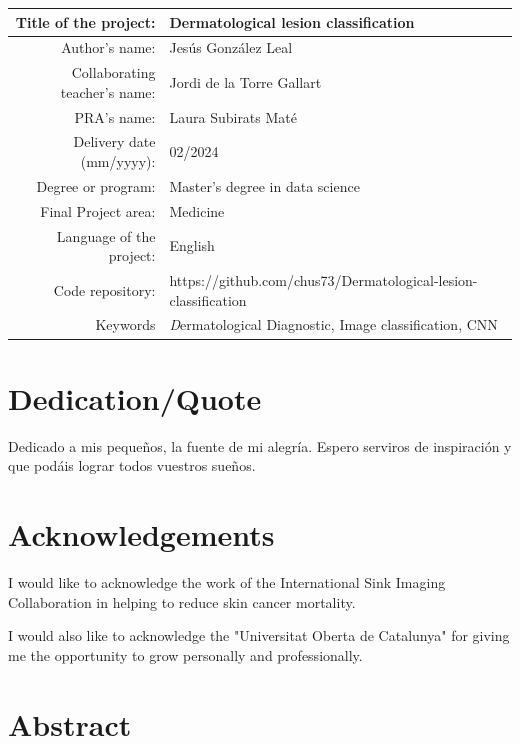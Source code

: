\begin{table}[ht]
\centering{}
\renewcommand{\arraystretch}{2}
\begin{tabular}{r | l}
\hline
Title of the project: & Dermatological lesion classification\\
\hline
Author's name: & Jesús González Leal\\
\hline
Collaborating teacher's name: & Jordi de la Torre Gallart\\
\hline
PRA's name: & Laura Subirats Maté\\
\hline
Delivery date (mm/yyyy): & 02/2024\\
\hline
Degree or program: & Master’s degree in data science\\
\hline
Final Project area: & Medicine\\
\hline
Language of the project: & English\\
\hline
Code repository: & https://github.com/chus73/Dermatological-lesion-classification\\

\hline
Keywords & \textit Dermatological Diagnostic, Image classification, CNN  \\
\hline
\end{tabular}
\end{table}

\chapter*{Dedication/Quote}

Dedicado a mis pequeños, la fuente de mi alegría. Espero serviros de inspiración y que podáis lograr todos vuestros sueños. 

\chapter*{Acknowledgements}

I would like to acknowledge the work of the International Sink Imaging Collaboration \cite{isic_web} in helping to reduce skin cancer mortality. 

I would also like to acknowledge the "Universitat Oberta de Catalunya" for giving me the opportunity to grow personally and professionally.

\chapter*{Abstract}

